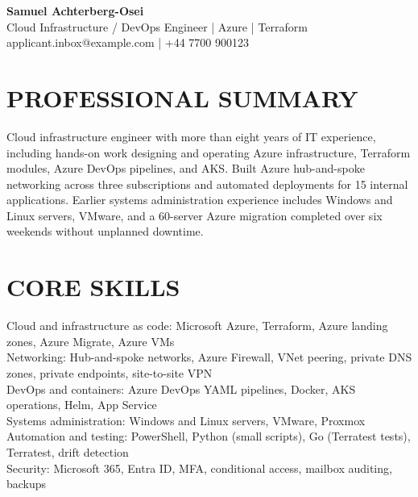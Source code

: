 \documentclass[11pt,a4paper]{article}
\begin{document}
\begin{center}
{\Huge\bfseries\color{primarycolor} Samuel Achterberg-Osei}\\[0.35em]
{\large\color{accentcolor} Cloud Infrastructure / DevOps Engineer | Azure | Terraform}\\[0.25em]
{\small applicant.inbox@example.com | +44 7700 900123}
\end{center}
\vspace{0.4em}
\section*{PROFESSIONAL SUMMARY}
Cloud infrastructure engineer with more than eight years of IT experience, including hands-on work designing and operating Azure infrastructure, Terraform modules, Azure DevOps pipelines, and AKS. Built Azure hub-and-spoke networking across three subscriptions and automated deployments for 15 internal applications. Earlier systems administration experience includes Windows and Linux servers, VMware, and a 60-server Azure migration completed over six weekends without unplanned downtime.
\section*{CORE SKILLS}
Cloud and infrastructure as code: Microsoft Azure, Terraform, Azure landing zones, Azure Migrate, Azure VMs\\
Networking: Hub-and-spoke networks, Azure Firewall, VNet peering, private DNS zones, private endpoints, site-to-site VPN\\
DevOps and containers: Azure DevOps YAML pipelines, Docker, AKS operations, Helm, App Service\\
Systems administration: Windows and Linux servers, VMware, Proxmox\\
Automation and testing: PowerShell, Python (small scripts), Go (Terratest tests), Terratest, drift detection\\
Security: Microsoft 365, Entra ID, MFA, conditional access, mailbox auditing, backups
\end{document}
